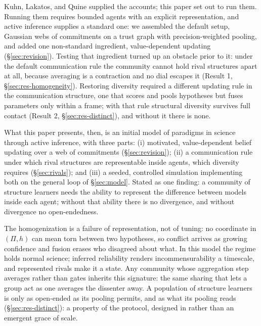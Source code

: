 \documentclass[runningheads]{llncs}
\begin{document}
Kuhn, Lakatos, and Quine supplied the accounts; this paper set out to run them. Running them
requires bounded agents with an explicit representation, and active inference supplies a
standard one: we assembled the default setup, Gaussian webs of commitments on a trust graph
with precision-weighted pooling, and added one non-standard ingredient, value-dependent updating
(\S\ref{sec:revision}). Testing that ingredient turned up an obstacle prior to it: under the
default communication rule the community cannot hold rival structures apart at all, because
averaging is a contraction and no dial escapes it (Result 1, \S\ref{sec:res-homogeneity}).
Restoring diversity required a different updating rule in the communication structure, one
that scores and pools hypotheses but fuses parameters only within a frame; with that rule
structural diversity survives full contact (Result 2, \S\ref{sec:res-distinct}), and without
it there is none.

What this paper presents, then, is an initial model of paradigms in science through active
inference, with three parts: (i) motivated, value-dependent belief updating over a web of
commitments (\S\ref{sec:revision}); (ii) a communication rule under which rival structures
are representable inside agents, which diversity requires (\S\ref{sec:rivals}); and (iii) a
seeded, controlled simulation implementing both on the general loop of \S\ref{sec:model}.
Stated as one finding: a community of structure learners needs the ability to represent the
difference between models inside each agent; without that ability there is no
divergence, and without divergence no open-endedness.

The homogenization is a failure of representation, not of tuning: no coordinate in
$(\Pi,h)$ can mean torn between two hypotheses, so conflict arrives as growing
confidence and fusion erases who disagreed about what. In this model the regime holds
normal science; inferred reliability renders incommensurability \citep{kuhn1983} a
timescale, and represented rivals make it a state. Any community whose aggregation step
averages rather than gates inherits
this signature: the same sharing that lets a group act as one
\citep{albarracin2024protentions} averages the dissenter away. A population of structure
learners is only as open-ended as its pooling permits, and as what its pooling reads
(\S\ref{sec:res-distinct}): a property of the protocol, designed in rather than an emergent
grace of scale.
\end{document}

